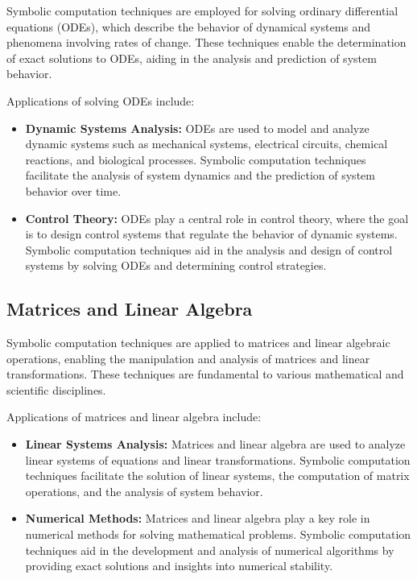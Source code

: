 Symbolic computation techniques are employed for solving ordinary differential equations (ODEs), which describe the behavior of dynamical systems and phenomena involving rates of change. These techniques enable the determination of exact solutions to ODEs, aiding in the analysis and prediction of system behavior.

Applications of solving ODEs include:
%
\begin{itemize}
  \item \textbf{Dynamic Systems Analysis:} ODEs are used to model and analyze dynamic systems such as mechanical systems, electrical circuits, chemical reactions, and biological processes. Symbolic computation techniques facilitate the analysis of system dynamics and the prediction of system behavior over time.
  \item \textbf{Control Theory:} ODEs play a central role in control theory, where the goal is to design control systems that regulate the behavior of dynamic systems. Symbolic computation techniques aid in the analysis and design of control systems by solving ODEs and determining control strategies.
\end{itemize}

\subsection{Matrices and Linear Algebra}

Symbolic computation techniques are applied to matrices and linear algebraic operations, enabling the manipulation and analysis of matrices and linear transformations. These techniques are fundamental to various mathematical and scientific disciplines.

Applications of matrices and linear algebra include:
%
\begin{itemize}
  \item \textbf{Linear Systems Analysis:} Matrices and linear algebra are used to analyze linear systems of equations and linear transformations. Symbolic computation techniques facilitate the solution of linear systems, the computation of matrix operations, and the analysis of system behavior.
  \item \textbf{Numerical Methods:} Matrices and linear algebra play a key role in numerical methods for solving mathematical problems. Symbolic computation techniques aid in the development and analysis of numerical algorithms by providing exact solutions and insights into numerical stability.
\end{itemize}

